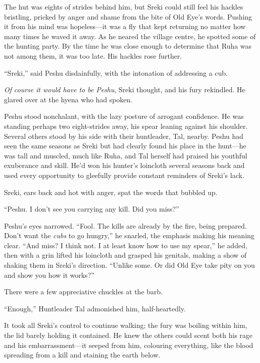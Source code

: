 \secdiv

\noindent The hut was eights of strides behind him, but Sreki could still feel his hackles bristling, pricked by anger and shame from the bite of Old Eye's words. Pushing it from his mind was hopeless---it was a fly that kept returning no matter how many times he waved it away. As he neared the village centre, he spotted some of the hunting party. By the time he was close enough to determine that Ruha was not among them, it was too late. His hackles rose further.

``Sreki,'' said Peshu disdainfully, with the intonation of addressing a cub.

\emph{Of course it would have to be Peshu}, Sreki thought, and his fury rekindled. He glared over at the hyena who had spoken.

Peshu stood nonchalant, with the lazy posture of arrogant confidence. He was standing perhaps two eight-strides away, his spear leaning against his shoulder. Several others stood by his side with their huntleader, Tal, nearby. Peshu had seen the same seasons as Sreki but had clearly found his place in the hunt---he was tall and muscled, much like Ruha, and Tal herself had praised his youthful exuberance and skill. He'd won his hunter's loincloth several seasons back and used every opportunity to gleefully provide constant reminders of Sreki's lack.

Sreki, ears back and hot with anger, spat the words that bubbled up.

``Peshu. I don't see you carrying any kill. Did you miss?''

Peshu's eyes narrowed. ``Fool. The kills are already by the fire, being prepared. Don't want the \emph{cubs} to go hungry,'' he snarled, the emphasis making his meaning clear. ``And miss? I think not. I at least know how to use my spear,'' he added, then with a grin lifted his loincloth and grasped his genitals, making a show of shaking them in Sreki's direction. ``Unlike some. Or did Old Eye take pity on you and show you how it works?''

There were a few appreciative chuckles at the barb.

``Enough,'' Huntleader Tal admonished him, half-heartedly.

It took all Sreki's control to continue walking; the fury was boiling within him, the lid barely holding it contained. He knew the others could scent both his rage and his embarrassment---it seeped from him, colouring everything, like the blood spreading from a kill and staining the earth below.

